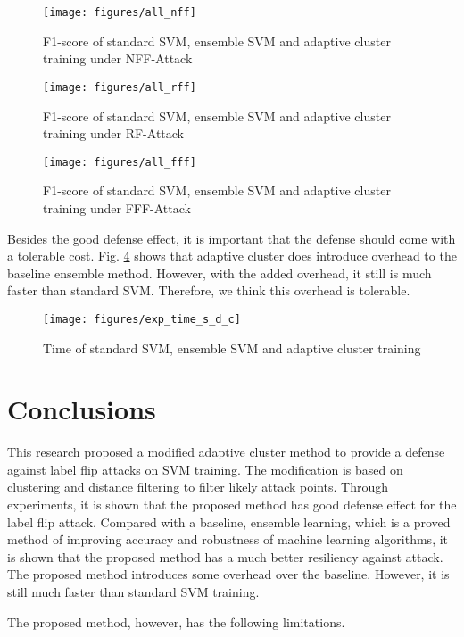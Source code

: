 \documentclass[10pt,conference,compsocconf,letterpaper]{IEEEtran}
\begin{document}
\begin{figure}[h]
  \centering
  \label{fig:all_nff}
  \texttt{[image: figures/all\_nff]}
  \caption{F1-score of standard SVM, ensemble SVM and adaptive cluster training under NFF-Attack}
\end{figure}
\begin{figure}[h]
  \centering
  \label{fig:all_rff}
  \texttt{[image: figures/all\_rff]}
  \caption{F1-score of standard SVM, ensemble SVM and adaptive cluster training under RF-Attack}
\end{figure}
\begin{figure}[h]
  \centering
  \label{fig:all_fff}
  \texttt{[image: figures/all\_fff]}
  \caption{F1-score of standard SVM, ensemble SVM and adaptive cluster training under FFF-Attack}
\end{figure}

Besides the good defense effect, it is important that the defense should come with a tolerable cost. Fig. \ref{fig:exp_time_s_d_c} shows that adaptive cluster does introduce overhead to the baseline ensemble method. However, with the added overhead, it still is much faster than standard SVM. Therefore, we think this overhead is tolerable.


\begin{figure}[h]
  \centering
  \label{fig:exp_time_s_d_c}
  \texttt{[image: figures/exp\_time\_s\_d\_c]}
  \caption{Time of standard SVM, ensemble SVM and adaptive cluster training}
\end{figure}

\section{Conclusions}

This research proposed a modified adaptive cluster method to provide a defense against label flip attacks on SVM training. The modification is based on clustering and distance filtering to filter likely attack points. Through experiments, it is shown that the proposed method has good defense effect for the label flip attack. Compared with a baseline, ensemble learning, which is a proved method of improving accuracy and robustness of machine learning algorithms, it is shown that the proposed method has a much better resiliency against attack. The proposed method introduces some overhead over the baseline. However, it is still much faster than standard SVM training.

The proposed method, however, has the following limitations. 
\end{document}

